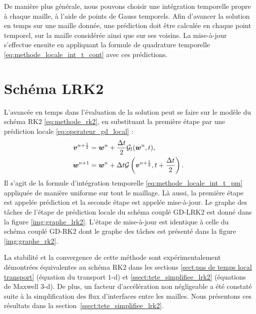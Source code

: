 De manière plus générale, nous pouvons choisir une intégration temporelle
propre à chaque maille, à l'aide de points de Gauss temporels.
Afin d'avancer la solution en temps sur une maille donnée,
une prédiction doit être calculée en chaque point temporel,
sur la maille considérée ainsi que sur ses voisins.
La mise-à-jour s'effectue ensuite en appliquant la formule de quadrature
temporelle \eqref{eq:methode_locale_int_t_cont} avec ces prédictions.
\\


\section{Schéma LRK2}
\label{sect:pas de temps local lrk2}


L'avancée en temps dans l'évaluation de la solution peut se faire
sur le modèle du schéma RK$2$ \eqref{eq:methode_rk2}, en substituant la première étape
par une prédiction locale \eqref{eq:operateur_gd_local} :
\begin{equation}
	\begin{aligned}
		\bm{v}^{n+\frac{1}{2}} &= \bm{w}^n
		+ \frac{\Delta t}{2} \mathcal{G}_l(\bm{w}^n,t) , \\
		\bm{w}^{n+1} &= \bm{w}^n
		+ \Delta t \mathcal{G}\left(\bm{v}^{n+\frac{1}{2}},t + \frac{\Delta t}{2}\right)
		\label{eq:methode_lrk2} .
	\end{aligned}
\end{equation}
Il s'agit de la formule d'intégration temporelle
\eqref{eq:methode_locale_int_t_pm}
appliquée de manière uniforme sur tout le maillage.
Là aussi, la première étape est appelée prédiction
et la seconde étape est appelée mise-à-jour.
Le graphe des tâches de l'étape de prédiction locale
du schéma couplé GD-LRK$2$ est donné dans la figure \ref{img:graphe_lrk2}.
L'étape de mise-à-jour est identique à celle du schéma couplé GD-RK$2$
dont le graphe des tâches est présenté dans la figure \ref{img:graphe_rk2}.

La stabilité et la convergence de cette méthode sont expérimentalement
démontrées équivalentes au schéma RK$2$ dans les sections
\ref{sect:pas de temps local transport} (équation du transport $1$-d)
et \ref{ssect:tete_simplifiee_lrk2} (équations de Maxwell $3$-d).
De plus, un facteur d'accélération
non négligeable a été constaté suite à la simplification des
flux d'interfaces entre les mailles. Nous présentons ces résultats
dans la section~\ref{ssect:tete_simplifiee_lrk2}.
\\


